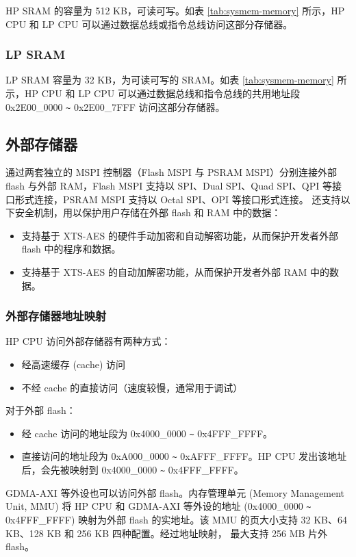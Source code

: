 \documentclass[main\_\_CN.tex]{subfiles}
\begin{document}
HP SRAM 的容量为 512 KB，可读可写。如表 \ref{tab:sysmem-memory} 所示，HP CPU 和 LP CPU 可以通过数据总线或指令总线访问这部分存储器。


\subsubsection{LP SRAM}

LP SRAM 容量为 32 KB，为可读可写的 SRAM。如表 \ref{tab:sysmem-memory} 所示，HP CPU 和 LP CPU 可以通过数据总线和指令总线的共用地址段 0x2E00\_0000 \verb+~+ 0x2E00\_7FFF 访问这部分存储器。


\subsection{外部存储器}
\label{para:sysmem-external-memory}


\chipname{} 通过两套独立的 MSPI 控制器（Flash MSPI 与 PSRAM MSPI）分别连接外部 flash 与外部 RAM，Flash MSPI 支持以 SPI、Dual SPI、Quad SPI、QPI 等接口形式连接，PSRAM MSPI 支持以 Octal SPI、OPI 等接口形式连接。\chipname{} 还支持以下安全机制，用以保护用户存储在外部 flash 和 RAM 中的数据：
\begin{itemize}
    \item 支持基于 XTS-AES 的硬件手动加密和自动解密功能，从而保护开发者外部 flash 中的程序和数据。
    \item 支持基于 XTS-AES 的自动加解密功能，从而保护开发者外部 RAM 中的数据。
\end{itemize}


\subsubsection{外部存储器地址映射}

HP CPU 访问外部存储器有两种方式：
\begin{itemize}
    \item 经高速缓存 (cache) 访问
    \item 不经 cache 的直接访问（速度较慢，通常用于调试）
\end{itemize}

对于外部 flash：
\begin{itemize}
    \item 经 cache 访问的地址段为 0x4000\_0000 \verb+~+ 0x4FFF\_FFFF。
    \item 直接访问的地址段为 0xA000\_0000 \verb+~+ 0xAFFF\_FFFF。HP CPU 发出该地址后，会先被映射到 0x4000\_0000 \verb+~+ 0x4FFF\_FFFF。
\end{itemize}
GDMA-AXI 等外设也可以访问外部 flash。内存管理单元 (Memory Management Unit, MMU) 将 HP CPU 和 GDMA-AXI 等外设的地址 (0x4000\_0000 \verb+~+ 0x4FFF\_FFFF) 映射为外部 flash 的实地址。该 MMU 的页大小支持 32 KB、64 KB、128 KB 和 256 KB 四种配置。经过地址映射，\chipname{} 最大支持 256 MB 片外 flash。
\end{document}
